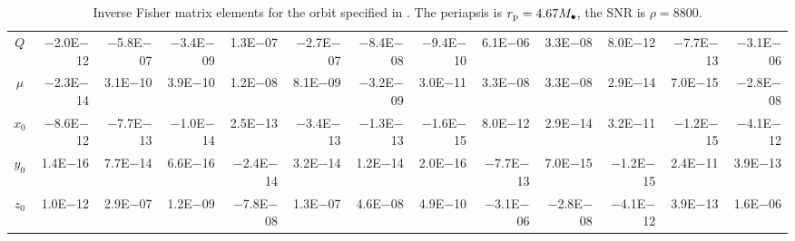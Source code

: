 \begin{sidewaystable}[htbp]
\begin{tabular}{crrrrrrrrrrrr}
$Q$ & $-$2.0E$-$12 & $-$5.8E$-$07 & $-$3.4E$-$09 & 1.3E$-$07 & $-$2.7E$-$07 & $-$8.4E$-$08 & $-$9.4E$-$10 & 6.1E$-$06 & 3.3E$-$08 & 8.0E$-$12 & $-$7.7E$-$13 & $-$3.1E$-$06 \\
$\mu$ & $-$2.3E$-$14 & 3.1E$-$10 & 3.9E$-$10 & 1.2E$-$08 & 8.1E$-$09 & $-$3.2E$-$09 & 3.0E$-$11 & 3.3E$-$08 & 3.3E$-$08 & 2.9E$-$14 & 7.0E$-$15 & $-$2.8E$-$08 \\
$x_0$ & $-$8.6E$-$12 & $-$7.7E$-$13 & $-$1.0E$-$14 & 2.5E$-$13 & $-$3.4E$-$13 & $-$1.3E$-$13 & $-$1.6E$-$15 & 8.0E$-$12 & 2.9E$-$14 & 3.2E$-$11 & $-$1.2E$-$15 & $-$4.1E$-$12 \\
$y_0$ & 1.4E$-$16 & 7.7E$-$14 & 6.6E$-$16 & $-$2.4E$-$14 & 3.2E$-$14 & 1.2E$-$14 & 2.0E$-$16 & $-$7.7E$-$13 & 7.0E$-$15 & $-$1.2E$-$15 & 2.4E$-$11 & 3.9E$-$13 \\
$z_0$ & 1.0E$-$12 & 2.9E$-$07 & 1.2E$-$09 & $-$7.8E$-$08 & 1.3E$-$07 & 4.6E$-$08 & 4.9E$-$10 & $-$3.1E$-$06 & $-$2.8E$-$08 & $-$4.1E$-$12 & 3.9E$-$13 & 1.6E$-$06 \\
\bottomrule
\end{tabular}
\caption{Inverse Fisher matrix elements for the orbit specified in . The periapsis is $r_\mathrm{p} = 4.67 M_\bullet$, the SNR is $\rho = 8800$.}
\label{tab:Fisher_1}
\end{sidewaystable}
